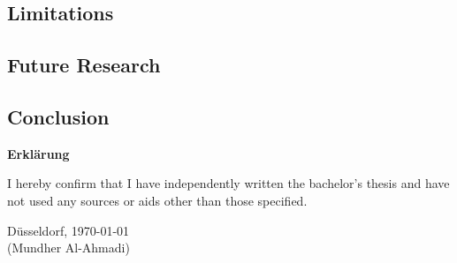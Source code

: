\documentclass[12pt,english,titlepage,a4paper]{article}
\begin{document}
\subsection{Limitations}
\subsection{Future Research}
\subsection{Conclusion}


\pagebreak





\pagebreak\noindent
\textbf{\LARGE Erkl\"arung}

\bigskip\bigskip
\noindent 
I hereby confirm that I have independently written the 
bachelor's thesis and have not used any sources or aids 
other than those specified.
\bigskip
\noindent

\bigskip\bigskip\bigskip
\noindent
D\"usseldorf, \today \\
(Mundher Al-Ahmadi)

% 
\end{document}
